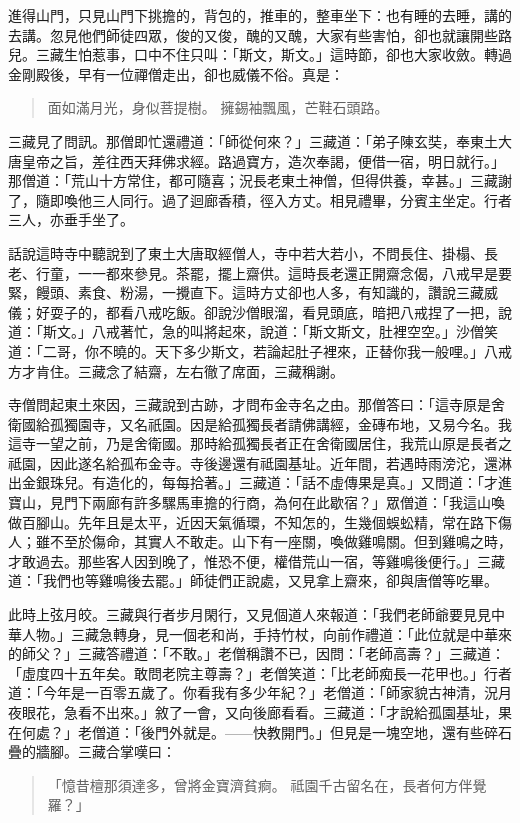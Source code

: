 進得山門，只見山門下挑擔的，背包的，推車的，整車坐下：也有睡的去睡，講的去講。忽見他們師徒四眾，俊的又俊，醜的又醜，大家有些害怕，卻也就讓開些路兒。三藏生怕惹事，口中不住只叫：「斯文，斯文。」這時節，卻也大家收斂。轉過金剛殿後，早有一位禪僧走出，卻也威儀不俗。真是：
\begin{quote}
面如滿月光，身似菩提樹。
擁錫袖飄風，芒鞋石頭路。
\end{quote}

三藏見了問訊。那僧即忙還禮道：「師從何來？」三藏道：「弟子陳玄奘，奉東土大唐皇帝之旨，差往西天拜佛求經。路過寶方，造次奉謁，便借一宿，明日就行。」那僧道：「荒山十方常住，都可隨喜；況長老東土神僧，但得供養，幸甚。」三藏謝了，隨即喚他三人同行。過了迴廊香積，徑入方丈。相見禮畢，分賓主坐定。行者三人，亦垂手坐了。

話說這時寺中聽說到了東土大唐取經僧人，寺中若大若小，不問長住、掛榻、長老、行童，一一都來參見。茶罷，擺上齋供。這時長老還正開齋念偈，八戒早是要緊，饅頭、素食、粉湯，一攪直下。這時方丈卻也人多，有知識的，讚說三藏威儀；好耍子的，都看八戒吃飯。卻說沙僧眼溜，看見頭底，暗把八戒捏了一把，說道：「斯文。」八戒著忙，急的叫將起來，說道：「斯文斯文，肚裡空空。」沙僧笑道：「二哥，你不曉的。天下多少斯文，若論起肚子裡來，正替你我一般哩。」八戒方才肯住。三藏念了結齋，左右徹了席面，三藏稱謝。

寺僧問起東土來因，三藏說到古跡，才問布金寺名之由。那僧答曰：「這寺原是舍衛國給孤獨園寺，又名祇園。因是給孤獨長者請佛講經，金磚布地，又易今名。我這寺一望之前，乃是舍衛國。那時給孤獨長者正在舍衛國居住，我荒山原是長者之祗園，因此遂名給孤布金寺。寺後邊還有祗園基址。近年間，若遇時雨滂沱，還淋出金銀珠兒。有造化的，每每拾著。」三藏道：「話不虛傳果是真。」又問道：「才進寶山，見門下兩廊有許多騾馬車擔的行商，為何在此歇宿？」眾僧道：「我這山喚做百腳山。先年且是太平，近因天氣循環，不知怎的，生幾個蜈蚣精，常在路下傷人；雖不至於傷命，其實人不敢走。山下有一座關，喚做雞鳴關。但到雞鳴之時，才敢過去。那些客人因到晚了，惟恐不便，權借荒山一宿，等雞鳴後便行。」三藏道：「我們也等雞鳴後去罷。」師徒們正說處，又見拿上齋來，卻與唐僧等吃畢。

此時上弦月皎。三藏與行者步月閑行，又見個道人來報道：「我們老師爺要見見中華人物。」三藏急轉身，見一個老和尚，手持竹杖，向前作禮道：「此位就是中華來的師父？」三藏答禮道：「不敢。」老僧稱讚不已，因問：「老師高壽？」三藏道：「虛度四十五年矣。敢問老院主尊壽？」老僧笑道：「比老師痴長一花甲也。」行者道：「今年是一百零五歲了。你看我有多少年紀？」老僧道：「師家貌古神清，況月夜眼花，急看不出來。」敘了一會，又向後廊看看。三藏道：「才說給孤園基址，果在何處？」老僧道：「後門外就是。——快教開門。」但見是一塊空地，還有些碎石疊的牆腳。三藏合掌嘆曰：
\begin{quote}
「憶昔檀那須達多，曾將金寶濟貧痾。
祗園千古留名在，長者何方伴覺羅？」
\end{quote}

